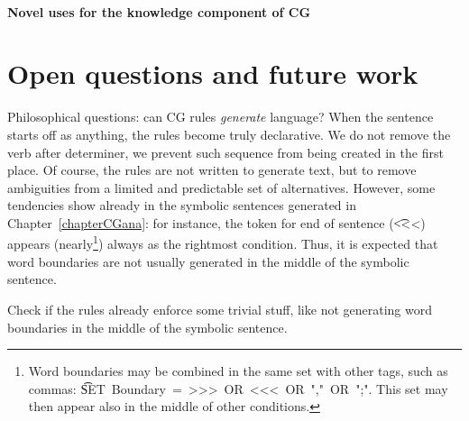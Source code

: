 \paragraph{Novel uses for the knowledge component of CG} 


\section{Open questions and future work}

Philosophical questions: can CG rules {\em generate} language?
When the sentence starts off as anything, the rules become truly declarative.
We do not remove the verb after determiner, we prevent such sequence from being created in the first place.
Of course, the rules are not written to generate text, but to remove ambiguities from a limited and predictable set of alternatives.
However, some tendencies show already in the symbolic sentences generated in Chapter~\ref{chapterCGana}: for instance, the token for end of sentence (\t{<<<}) appears 
(nearly\footnote{Word boundaries may be combined in the same set with other tags, such as commas: \t{SET~Boundary~=~>>>~OR~<<<~OR~","~OR~";"}. This set may then appear also in the middle of other conditions.}) 
always as the rightmost condition.
Thus, it is expected that word boundaries are not usually generated in the middle of the symbolic sentence.

Check if the rules already enforce some trivial stuff, like not generating word boundaries in the middle of the symbolic sentence.


